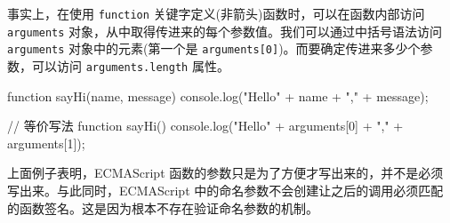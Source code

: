 事实上，在使用 \texttt{function} 关键字定义(非箭头)函数时，可以在函数内部访问 \texttt{arguments} 对象，从中取得传进来的每个参数值。我们可以通过中括号语法访问 \texttt{arguments} 对象中的元素(第一个是 \texttt{arguments[0]})。而要确定传进来多少个参数，可以访问 \texttt{arguments.length} 属性。

\begin{JavaScript}
function sayHi(name, message) {
    console.log("Hello" + name + "," + message);
    }
    
// 等价写法
function sayHi() {
    console.log("Hello" + arguments[0] + "," + arguments[1]);
}
\end{JavaScript}

上面例子表明，ECMAScript 函数的参数只是为了方便才写出来的，并不是必须写出来。与此同时，ECMAScript 中的命名参数不会创建让之后的调用必须匹配的函数签名。这是因为根本不存在验证命名参数的机制。

